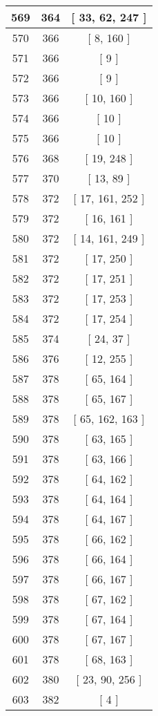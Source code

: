 \begin{center}
\begin{longtable}[H]{|| c c c ||}
569 & 364 & [ 33, 62, 247 ] \\ 
\hline
570 & 366 & [ 8, 160 ] \\ 
\hline
571 & 366 & [ 9 ] \\ 
\hline
572 & 366 & [ 9 ] \\ 
\hline
573 & 366 & [ 10, 160 ] \\ 
\hline
574 & 366 & [ 10 ] \\ 
\hline
575 & 366 & [ 10 ] \\ 
\hline
576 & 368 & [ 19, 248 ] \\ 
\hline
577 & 370 & [ 13, 89 ] \\ 
\hline
578 & 372 & [ 17, 161, 252 ] \\ 
\hline
579 & 372 & [ 16, 161 ] \\ 
\hline
580 & 372 & [ 14, 161, 249 ] \\ 
\hline
581 & 372 & [ 17, 250 ] \\ 
\hline
582 & 372 & [ 17, 251 ] \\ 
\hline
583 & 372 & [ 17, 253 ] \\ 
\hline
584 & 372 & [ 17, 254 ] \\ 
\hline
585 & 374 & [ 24, 37 ] \\ 
\hline
586 & 376 & [ 12, 255 ] \\ 
\hline
587 & 378 & [ 65, 164 ] \\ 
\hline
588 & 378 & [ 65, 167 ] \\ 
\hline
589 & 378 & [ 65, 162, 163 ] \\ 
\hline
590 & 378 & [ 63, 165 ] \\ 
\hline
591 & 378 & [ 63, 166 ] \\ 
\hline
592 & 378 & [ 64, 162 ] \\ 
\hline
593 & 378 & [ 64, 164 ] \\ 
\hline
594 & 378 & [ 64, 167 ] \\ 
\hline
595 & 378 & [ 66, 162 ] \\ 
\hline
596 & 378 & [ 66, 164 ] \\ 
\hline
597 & 378 & [ 66, 167 ] \\ 
\hline
598 & 378 & [ 67, 162 ] \\ 
\hline
599 & 378 & [ 67, 164 ] \\ 
\hline
600 & 378 & [ 67, 167 ] \\ 
\hline
601 & 378 & [ 68, 163 ] \\ 
\hline
602 & 380 & [ 23, 90, 256 ] \\ 
\hline
603 & 382 & [ 4 ] \\ 

\end{longtable}
\end{center}
